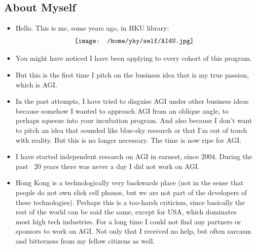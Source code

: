 \begin{preview}

\begin{minipage}{\textwidth}
\setlength{\parskip}{0.4\baselineskip}

\maketitle

\section{About Myself}

\begin{itemize}

	\item Hello. This is me, some years ago, in HKU library: \\
	\begin{equation}
	\nonumber
	\vcenter{\hbox{\texttt{[image: /home/yky/self/AI4U.jpg]}}}
	\end{equation}

	\item You might have noticed I have been applying to every cohort of this program.
	
	\item But this is the first time I pitch on the business idea that is my true passion, which is AGI.
	
	\item In the past attempts, I have tried to disguise AGI under other business ideas because somehow I wanted to approach AGI from an oblique angle, to perhaps squeeze into your incubation program.  And also because I don't want to pitch an idea that sounded like blue-sky research or that I'm out of touch with reality.  But this is no longer necessary.  The time is now ripe for AGI.
	
	\item I have started independent research on AGI in earnest, since 2004.  During the past ~20 years there was never a day I did not work on AGI.
	
	\item Hong Kong is a technologically very backwards place (not in the sense that people do not own slick cell phones, but we are not part of the developers of these technologies).  Perhaps this is a too-harsh criticism, since basically the rest of the world can be said the same, except for USA, which dominates most high tech industries.  For a long time I could not find any partners or sponsors to work on AGI.  Not only that I received no help, but often sarcasm and bitterness from my fellow citizens as well.
	

\end{itemize}
\end{minipage}
\end{preview}
